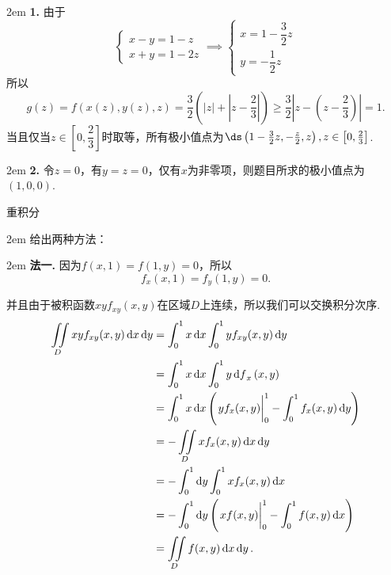 \documentclass[UTF8,14pt,normal]{ctexart}
\begin{document}
    \hangindent 2em
    \noindent
    \textbf{1.}
    由于
    \begin{equation*}
        \begin{cases}
            x-y = 1-z\\
            x+y = 1-2z
        \end{cases}
        \implies
        \begin{cases}
            x = 1-\dfrac{3}{2}z\\[1.5ex]
            y = -\dfrac{1}{2}z
        \end{cases}
    \end{equation*}
    所以\[g(z) = f(x(z),y(z),z) = \dfrac{3}{2}\left(|z|+\left\lvert z-\dfrac{2}{3}\right\rvert\right)\geqslant\frac{3}{2}\left\lvert z-\left(z-\frac{2}{3}\right)\right\rvert = 1.\]
    当且仅当\(z\in\left[0,\dfrac{2}{3}\right]\)时取等，所有极小值点为\(\ds \left(1-\frac{3}{2}z,-\frac{z}{2},z\right),z\in\left[0,\frac{2}{3}\right]\).

    \hangindent 2em
    \noindent
    \textbf{2.}
    令\(z=0\)，有\(y = z = 0\)，仅有\(x\)为非零项，则题目所求的极小值点为\((1,0,0)\).

 重积分

    \hangindent 2em
    \noindent
    给出两种方法：

    \hangindent 2em
    \noindent
    \textbf{法一.}
    因为\(f(x,1) = f(1,y) = 0\)，所以\[f_x(x,1) = f_y(1,y) = 0.\]

    并且由于被积函数\(xyf_{xy}(x,y)\)在区域\(D\)上连续，所以我们可以交换积分次序.
    \begin{equation*}
        \begin{split}
            \iint\limits_{D}xyf_{xy}(x,y)\dd{x}\dd{y} &= \int_{0}^{1}x\dd{x}\int_{0}^{1}yf_{xy}(x,y)\dd{y}\\
            &= \int_{0}^{1}x\dd{x}\int_{0}^{1}y\dd{f}_{x}(x,y)\\
            &= \int_{0}^{1}x\dd{x}\left(\eval{yf_x(x,y)}_0^1-\int_{0}^{1}f_x(x,y)\dd{y}\right)\\
            &= -\iint\limits_{D}xf_x(x,y)\dd{x}\dd{y}\\
            &= -\int_{0}^{1}\dd{y}\int_{0}^{1}xf_x(x,y)\dd{x}\\
            &= -\int_{0}^{1}\dd{y}\left(\eval{xf(x,y)}_0^1-\int_{0}^{1}f(x,y)\dd{x}\right)\\
            &= \iint\limits_{D}f(x,y)\dd{x}\dd{y}.
        \end{split}
    \end{equation*}
\end{document}
